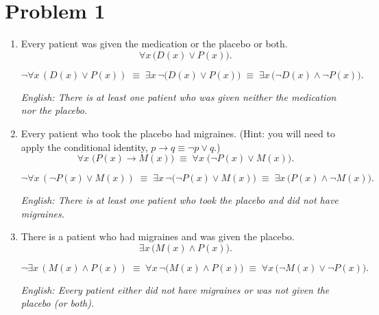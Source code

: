 \documentclass{amsart}
\theoremstyle{definition}
\theoremstyle{Exercise}
\theoremstyle{remark}
\theoremstyle{rule}
\numberwithin{equation}{section}
\begin{document}
\section*{Problem 1}
\begin{enumerate}[label=(\alph*)]

\item Every patient was given the medication or the placebo or both.\\

\[
  \forall x\,\bigl(D(x)\lor P(x)\bigr).
\]

\[
  \neg\forall x\,(D(x)\lor P(x))
  \;\equiv\;
  \exists x\,\neg\bigl(D(x)\lor P(x)\bigr)
  \;\equiv\;
  \exists x\,\bigl(\neg D(x)\land \neg P(x)\bigr).
\]

\textit{English: There is at least one patient who was given neither the medication nor the placebo.}

\item Every patient who took the placebo had migraines. (Hint: you will need to apply the conditional identity, $p \to q \equiv \neg p \lor q$.)\\

\[
  \forall x\;\bigl(P(x)\to M(x)\bigr)
  \;\equiv\;
  \forall x\;\bigl(\neg P(x)\lor M(x)\bigr).
\]

\[
  \neg\forall x\,(\neg P(x)\lor M(x))
  \;\equiv\;
  \exists x\,\neg\bigl(\neg P(x)\lor M(x)\bigr)
  \;\equiv\;
  \exists x\,\bigl(P(x)\land \neg M(x)\bigr).
\]

\textit{English: There is at least one patient who took the placebo and did not have migraines.}

\item There is a patient who had migraines and was given the placebo.\\

\[
  \exists x\,\bigl(M(x)\land P(x)\bigr).
\]

\[
  \neg\exists x\,(M(x)\land P(x))
  \;\equiv\;
  \forall x\,\neg\bigl(M(x)\land P(x)\bigr)
  \;\equiv\;
  \forall x\,\bigl(\neg M(x)\lor \neg P(x)\bigr).
\]

\textit{English: Every patient either did not have migraines or was not given the placebo (or both).}

\end{enumerate}
\end{document}
